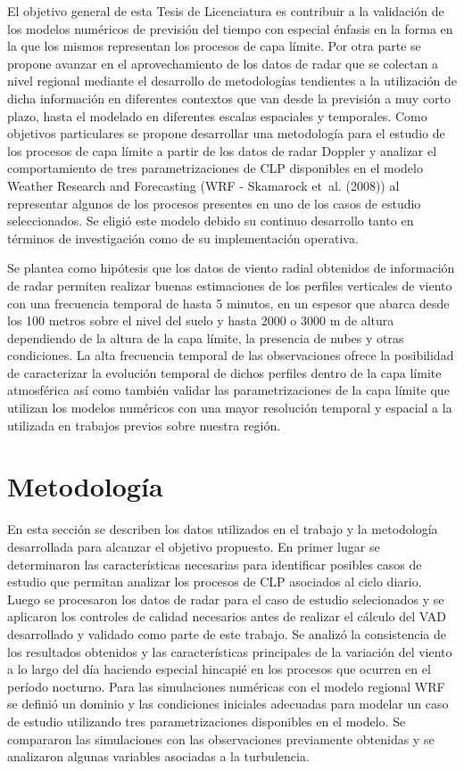 \documentclass[12pt,spanish,oneside, a4paper]{book}
\begin{document}
El objetivo general de esta Tesis de Licenciatura es contribuir a la
validación de los modelos numéricos de previsión del tiempo con especial
énfasis en la forma en la que los mismos representan los procesos de
capa límite. Por otra parte se propone avanzar en el aprovechamiento de
los datos de radar que se colectan a nivel regional mediante el
desarrollo de metodologías tendientes a la utilización de dicha
información en diferentes contextos que van desde la previsión a muy
corto plazo, hasta el modelado en diferentes escalas espaciales y
temporales. Como objetivos particulares se propone desarrollar una
metodología para el estudio de los procesos de capa límite a partir de
los datos de radar Doppler y analizar el comportamiento de tres
parametrizaciones de CLP disponibles en el modelo Weather Research and
Forecasting (WRF - Skamarock et~al. (2008)) al representar algunos de
los procesos presentes en uno de los casos de estudio seleccionados. Se
eligió este modelo debido su continuo desarrollo tanto en términos de
investigación como de su implementación operativa.

Se plantea como hipótesis que los datos de viento radial obtenidos de
información de radar permiten realizar buenas estimaciones de los
perfiles verticales de viento con una frecuencia temporal de hasta 5
minutos, en un espesor que abarca desde los 100 metros sobre el nivel
del suelo y hasta 2000 o 3000 m de altura dependiendo de la altura de la
capa límite, la presencia de nubes y otras condiciones. La alta
frecuencia temporal de las observaciones ofrece la posibilidad de
caracterizar la evolución temporal de dichos perfiles dentro de la capa
límite atmosférica así como también validar las parametrizaciones de la
capa límite que utilizan los modelos numéricos con una mayor resolución
temporal y espacial a la utilizada en trabajos previos sobre nuestra
región.

\chapter{Metodología}\label{metodologia}

En esta sección se describen los datos utilizados en el trabajo y la
metodología desarrollada para alcanzar el objetivo propuesto. En primer
lugar se determinaron las características necesarias para identificar
posibles casos de estudio que permitan analizar los procesos de CLP
asociados al ciclo diario. Luego se procesaron los datos de radar para
el caso de estudio selecionados y se aplicaron los controles de calidad
necesarios antes de realizar el cálculo del VAD desarrollado y validado
como parte de este trabajo. Se analizó la consistencia de los resultados
obtenidos y las características principales de la variación del viento a
lo largo del día haciendo especial hincapié en los procesos que ocurren
en el período nocturno. Para las simulaciones numéricas con el modelo
regional WRF se definió un dominio y las condiciones iniciales adecuadas
para modelar un caso de estudio utilizando tres parametrizaciones
disponibles en el modelo. Se compararon las simulaciones con las
observaciones previamente obtenidas y se analizaron algunas variables
asociadas a la turbulencia.
\end{document}
